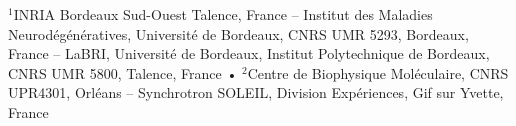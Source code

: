 $^{1}$INRIA Bordeaux Sud-Ouest
      Talence, France --
      Institut des Maladies Neurodégénératives, Université de Bordeaux,
      CNRS UMR 5293, Bordeaux, France -- 
      LaBRI, Université de Bordeaux, Institut Polytechnique de Bordeaux,
      CNRS UMR 5800, Talence, France
      •
$^{2}$Centre de Biophysique Moléculaire,
      CNRS UPR4301, Orléans --
      Synchrotron SOLEIL, Division Expériences,
      Gif sur Yvette, France
\par
